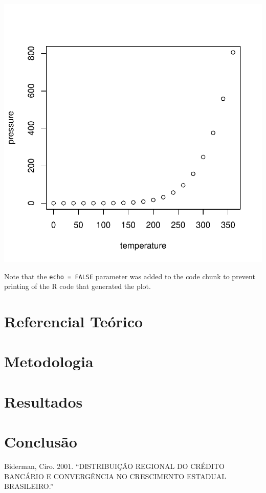 \documentclass[12pt,english, french, spanish, brazil,a4paper,twoside, openright]{abntex2}	%
\begin{document}
\begin{center}\includegraphics{Monografia_files/figure-latex/pressure-1} \end{center}

Note that the \texttt{echo\ =\ FALSE} parameter was added to the code
chunk to prevent printing of the R code that generated the plot.

\chapter{Referencial Teórico}

\chapter{Metodologia}

\chapter{Resultados}

\chapter{Conclusão}

\hypertarget{refs}{}
\leavevmode\hypertarget{ref-Biderman2004}{}%
Biderman, Ciro. 2001. ``DISTRIBUIÇÃO REGIONAL DO CRÉDITO BANCÁRIO E
CONVERGÊNCIA NO CRESCIMENTO ESTADUAL BRASILEIRO.''
\end{document}

